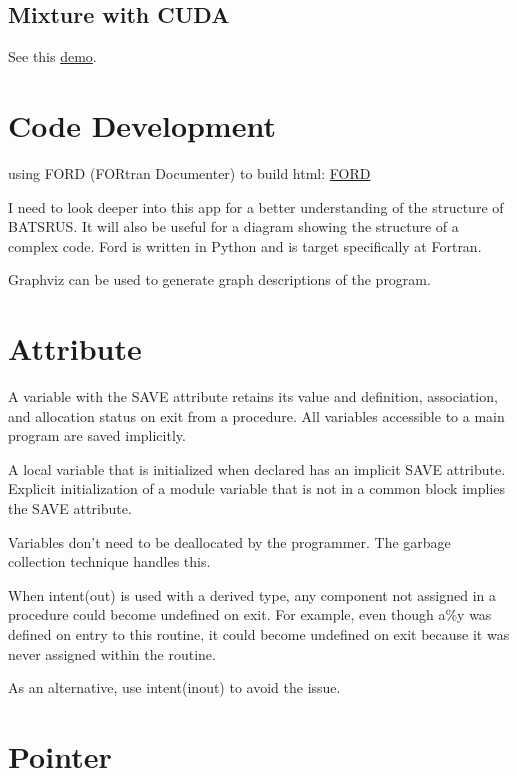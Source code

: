 \documentclass[11pt]{book} %
\begin{document}
\subsection{Mixture with CUDA}

See this \href{https://stackoverflow.com/questions/35150748/mixed-language-cuda-programming}{demo}.


\section{Code Development}
using FORD (FORtran Documenter) to build html:
\href{https://github.com/Fortran-FOSS-Programmers/ford}{FORD}

I need to look deeper into this app for a better understanding of the structure of BATSRUS. It will also be useful for a diagram showing the structure of a complex code. Ford is written in Python and is target specifically at Fortran.

Graphviz can be used to generate graph descriptions of the program.

\section{Attribute}

A variable with the SAVE attribute retains its value and definition, association, and allocation status on exit from a procedure. All variables accessible to a main program are saved implicitly. 

A local variable that is initialized when declared has an implicit SAVE attribute. Explicit initialization of a module variable that is not in a common block implies the SAVE attribute.

Variables don't need to be deallocated by the programmer. The garbage collection technique handles this.

When intent(out) is used with a derived type, any component not assigned in a procedure could become undefined on exit. For example, even though a\%y was defined on entry to this routine, it could become undefined on exit because it was never assigned within the routine.

As an alternative, use intent(inout) to avoid the issue.


\section{Pointer}
\end{document}
